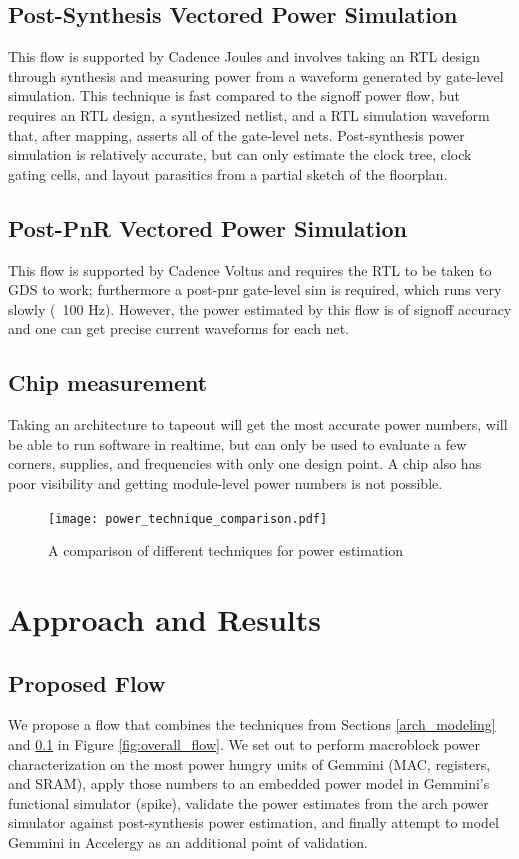 \documentclass[sigconf]{acmart}
\begin{document}
\subsection{Post-Synthesis Vectored Power Simulation}\label{syn_modeling}
This flow is supported by Cadence Joules and involves taking an RTL design through synthesis and measuring power from a waveform generated by gate-level simulation.
This technique is fast compared to the signoff power flow, but requires an RTL design, a synthesized netlist, and a RTL simulation waveform that, after mapping, asserts all of the gate-level nets.
Post-synthesis power simulation is relatively accurate, but can only estimate the clock tree, clock gating cells, and layout parasitics from a partial sketch of the floorplan.

\subsection{Post-PnR Vectored Power Simulation}
This flow is supported by Cadence Voltus and requires the RTL to be taken to GDS to work; furthermore a post-pnr gate-level sim is required, which runs very slowly (~100 Hz).
However, the power estimated by this flow is of signoff accuracy and one can get precise current waveforms for each net.

\subsection{Chip measurement}
Taking an architecture to tapeout will get the most accurate power numbers, will be able to run software in realtime, but can only be used to evaluate a few corners, supplies, and frequencies with only one design point.
A chip also has poor visibility and getting module-level power numbers is not possible.

\begin{figure}
  \centering
  \texttt{[image: power\_technique\_comparison.pdf]}
  \caption{A comparison of different techniques for power estimation}
  \label{fig:power_technique_comparison}
\end{figure}

\section{Approach and Results}

\subsection{Proposed Flow}
We propose a flow that combines the techniques from Sections \ref{arch_modeling} and \ref{syn_modeling} in Figure \ref{fig:overall_flow}.
We set out to perform macroblock power characterization on the most power hungry units of Gemmini (MAC, registers, and SRAM), apply those numbers to an embedded power model in Gemmini's functional simulator (spike), validate the power estimates from the arch power simulator against post-synthesis power estimation, and finally attempt to model Gemmini in Accelergy as an additional point of validation.
\end{document}
